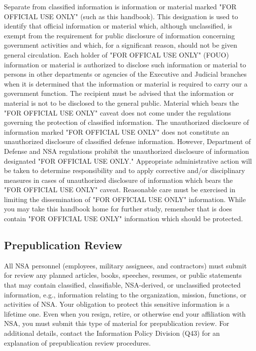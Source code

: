 \documentclass[a4]{article}
\begin{document}
Separate from classified information is information or material marked "FOR
OFFICIAL USE ONLY" (such as this handbook).  This designation is used to
identify that official information or material which, although unclassified, is
exempt from the requirement for public disclosure of information concerning
government activities and which, for a significant reason, should not be given
general circulation.  Each holder of "FOR OFFICAL USE ONLY" (FOUO) information
or material is authorized to disclose such information or material to persons
in other departments or agencies of the Executive and Judicial branches when it
is determined that the information or material is required to carry our a
government function.  The recipient must be advised that the information or
material is not to be disclosed to the general public.  Material which bears
the "FOR OFFICIAL USE ONLY" caveat does not come under the regulations
governing the protection of classified information.  The unauthorized
disclosure of information marked "FOR OFFICIAL USE ONLY" does not constitute an
unauthorized disclosure of classified defense information.  However, Department
of Defense and NSA regulations prohibit the unauthorized disclosure of
information designated "FOR OFFICIAL USE ONLY."  Appropriate administrative
action will be taken to determine responsibility and to apply corrective and/or
disciplinary measures in cases of unauthorized disclosure of information which
bears the "FOR OFFICIAL USE ONLY" caveat.  Reasonable care must be exercised in
limiting the dissemination of "FOR OFFICIAL USE ONLY" information.  While you
may take this handbook home for further study, remember that is does contain
"FOR OFFICIAL USE ONLY" information which should be protected.

\subsection{Prepublication Review}

All NSA personnel (employees, military assignees, and contractors) must submit
for review any planned articles, books, speeches, resumes, or public statements
that may contain classified, classifiable, NSA-derived, or unclassified
protected information, e.g., information relating to the organization, mission,
functions, or activities of NSA.  Your obligation to protect this sensitive
information is a lifetime one.  Even when you resign, retire, or otherwise end
your affiliation with NSA, you must submit this type of material for
prepublication review.  For additional details, contact the Information Policy
Division (Q43) for an explanation of prepublication review procedures.
\end{document}
